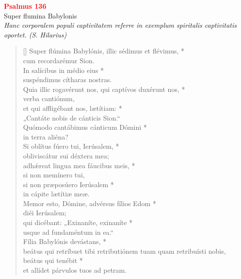 


\def\greinitialformat#1{%
{\fontsize{39}{39}\selectfont #1}%
}




\vspace{0.3cm}
\begin{center}
 \textcolor{red}{\large \bf Psalmus 136}\\
Super flumina Babylonis\\
\textit{\small Hanc corporalem populi captivitatem referre in exemplum spiritalis captivitatis oportet. (S. Hilarius)}
\end{center}
\begin{verse}[\versewidth]
Super flúmina Babylónis, illic sédimus et flévimus, *\\
cum recordarémur Sion.\\
\vin In salícibus in médio eius *\\
\vin suspéndimus cítharas nostras.\\
Quia illic rogavérunt nos, qui captívos duxérunt nos, *\\
verba cantiónum,\\
\vin et qui affligébant nos, lætítiam: *\\
\vin „Cantáte nobis de cánticis Sion.“\\
Quómodo cantábimus cánticum Dómini *\\
in terra aliéna?\\
\vin Si oblítus fúero tui, Ierúsalem, *\\
\vin obliviscátur sui déxtera mea;\\
adh\'{æ}reat lingua mea fáucibus meis, *\\
si non memínero tui,\\
\vin si non præposúero Ierúsalem *\\
\vin in cápite lætítiæ meæ.\\
Memor esto, Dómine, advérsus fílios Edom *\\
diéi Ierúsalem;\\
\vin qui dicébant: „Exinaníte, exinaníte *\\
\vin usque ad fundaméntum in ea.“\\
Fília Babylónis devástans, *\\
beátus qui retríbuet tibi retributiónem tuam quam retribuísti nobis,\\
\vin beátus qui tenébit *\\
\vin et allídet párvulos tuos ad petram.\\
\end{verse}
\vspace{1cm}



